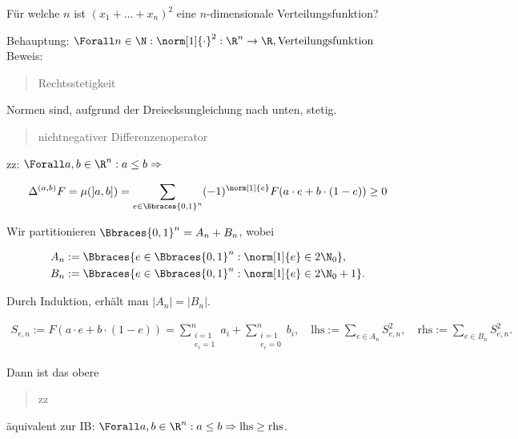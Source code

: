 
\begin{exercise}

Für welche $n$ ist $(x_1 + \ldots + x_n)^2$ eine $n$-dimensionale Verteilungsfunktion?

\end{exercise}


\begin{solution}

Behauptung: $\Forall n \in \N: \norm[1]{\cdot}^2: \R^n \to \R, \text{Verteilungsfunktion}$ \\

Beweis: \\

\blockquote{Rechtsstetigkeit}: Normen sind, aufgrund der Dreiecksungleichung nach unten, stetig. \\

\blockquote{nichtnegativer Differenzenoperator}: zz: $\Forall a, b \in \R^n: a \leq b \Rightarrow$

\begin{align*}
  \Delta^{(a, b)} F
  =
  \mu(]a, b])
  =
  \sum_{e \in \Bbraces{0, 1}^n}
  (-1)^{\norm[1]{e}}
  F(a \cdot e + b \cdot (1 - e)) \geq 0
\end{align*}

Wir partitionieren $\Bbraces{0, 1}^n = A_n + B_n$, wobei

\begin{align*}
  A_n & := \Bbraces{e \in \Bbraces{0, 1}^n: \norm[1]{e} \in 2 \N_0}, \\
  B_n & := \Bbraces{e \in \Bbraces{0, 1}^n: \norm[1]{e} \in 2 \N_0 + 1}.
\end{align*}

Durch Induktion, erhält man $|A_n| = |B_n|$.

\begin{align*}
  S_{e, n}
  :=
  F(a \cdot e + b \cdot (1 - e))
  =
  \sum_{\substack{i = 1 \\ e_i = 1}}^n a_i +
  \sum_{\substack{i = 1 \\ e_i = 0}}^n b_i,
  \quad
  \text{lhs} := \sum_{e \in A_n} S_{e, n}^2,
  \quad
  \text{rhs} := \sum_{e \in B_n} S_{e, n}^2.
\end{align*}

Dann ist das obere \blockquote{zz} äquivalent zur IB: $\Forall a, b \in \R^n: a \leq b \Rightarrow \text{lhs} \geq \text{rhs}$. \\


\end{solution}
